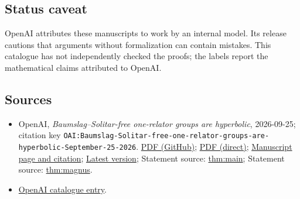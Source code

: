 \documentclass[11pt]{article}
\begin{document}
\subsection{Status caveat}
OpenAI attributes these manuscripts to work by an internal model. Its release cautions that arguments without formalization can contain mistakes. This catalogue has not independently checked the proofs; the labels report the mathematical claims attributed to OpenAI.

\subsection{Sources}
\begin{itemize}
\item OpenAI, \emph{Baumslag–Solitar-free one-relator groups are hyperbolic}, 2026-09-25; citation key \texttt{OAI:Baumslag-Solitar-free-one-relator-groups-are-hyperbolic-September-25-2026}. \href{https://github.com/openai/math/blob/adc7f1241b42e322a6451854ab7e4b4c146bf78a/preprints/Baumslag-Solitar-free-one-relator-groups-are-hyperbolic-September-25-2026/paper.pdf}{PDF (GitHub)}; \href{https://github.com/openai/math/raw/adc7f1241b42e322a6451854ab7e4b4c146bf78a/preprints/Baumslag-Solitar-free-one-relator-groups-are-hyperbolic-September-25-2026/paper.pdf}{PDF (direct)}; \href{https://github.com/openai/math/blob/adc7f1241b42e322a6451854ab7e4b4c146bf78a/preprints/Baumslag-Solitar-free-one-relator-groups-are-hyperbolic-September-25-2026/README.md}{Manuscript page and citation}; \href{https://github.com/openai/math/blob/main/preprints/Baumslag-Solitar-free-one-relator-groups-are-hyperbolic-September-25-2026/paper.pdf}{Latest version}; Statement source: \href{https://github.com/openai/math/blob/adc7f1241b42e322a6451854ab7e4b4c146bf78a/preprints/Baumslag-Solitar-free-one-relator-groups-are-hyperbolic-September-25-2026/build/source/introduction.tex\#L17}{thm:main}; Statement source: \href{https://github.com/openai/math/blob/adc7f1241b42e322a6451854ab7e4b4c146bf78a/preprints/Baumslag-Solitar-free-one-relator-groups-are-hyperbolic-September-25-2026/build/source/introduction.tex\#L202}{thm:magnus}.
\item \href{https://github.com/openai/math/blob/adc7f1241b42e322a6451854ab7e4b4c146bf78a/CONTENTS.md}{OpenAI catalogue entry}.
\end{itemize}
\end{document}
